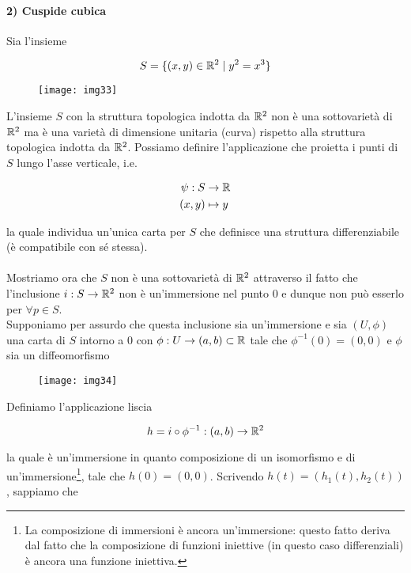 \paragraph{2) Cuspide cubica}

Sia l'insieme

\begin{equation}
	S = \{ (x,y) \in \mathbb{R}^{2} \mid y^{2}=x^{3} \}
\end{equation}

\begin{figure}[H]
	\centering
	\texttt{[image: img33]}
\end{figure}

L'insieme $ S $ con la struttura topologica indotta da $ \mathbb{R}^{2} $ non è una sottovarietà di $ \mathbb{R}^{2} $ ma è una varietà di dimensione unitaria (curva) rispetto alla struttura topologica indotta da $ \mathbb{R}^{2} $. Possiamo definire l'applicazione che proietta i punti di $ S $ lungo l'asse verticale, i.e.

\begin{align}
	\begin{split}
		\psi : S &\to \mathbb{R}\\
		(x,y) &\mapsto y
	\end{split}
\end{align}

la quale individua un'unica carta per $ S $ che definisce una struttura differenziabile (è compatibile con sé stessa).\\\\
%
Mostriamo ora che $ S $ non è una sottovarietà di $ \mathbb{R}^{2} $ attraverso il fatto che l'inclusione $ i : S \to \mathbb{R}^{2} $ non è un'immersione nel punto 0 e dunque non può esserlo per $ \forall p \in S $.\\
Supponiamo per assurdo che questa inclusione sia un'immersione e sia $ (U,\phi) $ una carta di $ S $ intorno a 0 con $ \phi : U \to (a,b) \subset \mathbb{R} $ tale che $ \phi^{-1}(0)=(0,0) $ e $ \phi $ sia un diffeomorfismo

\begin{figure}[H]
	\centering
	\texttt{[image: img34]}
\end{figure}

Definiamo l'applicazione liscia

\begin{equation}
	h = i \circ \phi^{-1} : (a,b) \to \mathbb{R}^{2}
\end{equation}

la quale è un'immersione in quanto composizione di un isomorfismo e di un'immersione\footnote{%
	La composizione di immersioni è ancora un'immersione: questo fatto deriva dal fatto che la composizione di funzioni iniettive (in questo caso differenziali) è ancora una funzione iniettiva.%
}, tale che $ h(0)=(0,0) $. Scrivendo $ h(t) = (h_{1}(t),h_{2}(t)) $, sappiamo che

